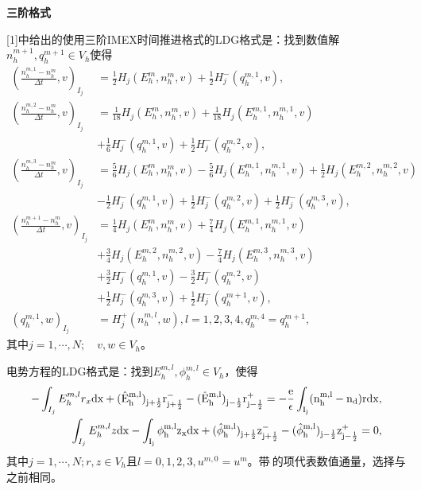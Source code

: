 \noindent \textbf{三阶格式}

[1]中给出的使用三阶IMEX时间推进格式的LDG格式是：找到数值解$n_h^{m+1},q_h^{m+1} \in V_h$使得
\begin{align}
    (\frac{n_h^{m,1} -n_h^m}{\Delta t},v)_{I_j} & =\frac{1}{2} H_j(E_h^m,n_h^m,v) + \frac{1}{2} H_j^-(q_h^{m,1},v),           \label{weakForm:IMEX3 LDG 1:translation}       \\
    (\frac{n_h^{m,2} -n_h^m}{\Delta t},v)_{I_j} & = \frac{1}{18} H_j(E_h^m,n_h^m,v) + \frac{1}{18} H_j(E_h^{m,1},n_h^{m,1},v) \nonumber                                      \\
                                                & + \frac{1}{6} H_j^-(q_h^{m,1},v) + \frac{1}{2} H_j^-(q_h^{m,2},v),                                                         \\
    (\frac{n_h^{m,3} -n_h^m}{\Delta t},v)_{I_j} & =\frac{5}{6} H_j(E_h^m,n_h^m,v) -\frac{5}{6} H_j(E_h^{m,1},n_h^{m,1},v) + \frac{1}{2} H_j(E_h^{m,2},n_h^{m,2},v) \nonumber \\
                                                & - \frac{1}{2} H_j^-(q_h^{m,1},v) + \frac{1}{2} H_j^-(q_h^{m,2},v) + \frac{1}{2} H_j^-(q_h^{m,3},v),                        \\
    (\frac{n_h^{m+1} -n_h^m}{\Delta t},v)_{I_j} & = \frac{1}{4} H_j(E_h^m,n_h^m,v) +\frac{7}{4} H_j(E_h^{m,1},n_h^{m,1},v)  \nonumber                                        \\
                                                & + \frac{3}{4} H_j(E_h^{m,2},n_h^{m,2},v) - \frac{7}{4} H_j(E_h^{m,3},n_h^{m,3},v) \nonumber                                \\
                                                & +\frac{3}{2} H_j^-(q_h^{m,1},v) -\frac{3}{2} H_j^-(q_h^{m,2},v) \nonumber                                                  \\
                                                & + \frac{1}{2} H_j^-(q_h^{m,3},v)  + \frac{1}{2} H_j^-(q_h^{m+1},v),                                                        \\
    (q_h^{m,1},w)_{I_j}                         & = H_j^+(n_h^{m,l},w), l = 1,2,3,4, q_h^{m,4} = q_h^{m+1},
\end{align}
其中$j = 1,\cdots,N;\quad v,w \in V_h$。

电势方程的LDG格式是：找到$E_h^{m,l},\phi_h^{m,l} \in V_h$，使得
\begin{align}
    -\int_{I_j} E_h^{m,l}r_x \rm{d}x + (\hat{E}_h^{m,l})_{j+\frac{1}{2}}r_{j+\frac{1}{2}}^- - (\hat{E}_h^{m,l})_{j-\frac{1}{2}}r_{j-\frac{1}{2}}^+ = -\frac{e}{\epsilon}\int_{I_j}(n_h^{m,l} - n_d) r\rm{d} x, \\
    \int_{I_j} E_h^{m,l}z \rm{d}x - \int_{I_j} \phi_h^{m,l}z_x \rm{d}x  + (\hat{\phi}_h^{m,l})_{j+\frac{1}{2}}z^-_{j+\frac{1}{2}} - (\hat{\phi}_h^{m,l})_{j-\frac{1}{2}}z_{j-\frac{1}{2}}^+  = 0,\label{equation:IMEX3 LDG:EPE 2:translation}
\end{align}
其中$j = 1,\cdots,N; r,z \in V_h$且$l = 0,1,2,3, u^{m,0} = u^m$。带$\hat{\ }$的项代表数值通量，选择与之前相同。
